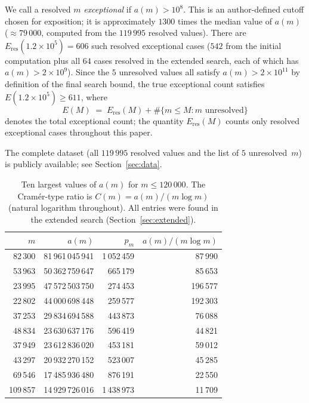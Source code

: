 \documentclass[pdflatex,sn-mathphys-num,Numbered]{sn-jnl}
\theoremstyle{thmstyleone}
\theoremstyle{thmstylethree}
\theoremstyle{thmstyletwo}
\numberwithin{equation}{section}
\begin{document}
We call a resolved $m$ \emph{exceptional} if $a(m) > 10^8$.
This is an author-defined cutoff chosen for exposition;
it is approximately $1300$ times the median value of $a(m)$
($\approx 79\,000$, computed from the $119\,995$ resolved values).
There are $E_{\mathrm{res}}(1.2 \times 10^5) = 606$ such resolved exceptional
cases ($542$ from the initial computation plus all $64$ cases resolved
in the extended search, each of which has $a(m) > 2 \times 10^9$).
Since the $5$ unresolved values all satisfy
$a(m) > 2 \times 10^{11}$ by definition of the final search bound,
the true exceptional count satisfies $E(1.2 \times 10^5) \geq 611$, where
\[
E(M) \;=\; E_{\mathrm{res}}(M)
+ \#\bigl\{m \leq M : m \text{ unresolved}\bigr\}
\]
denotes the total exceptional count; the quantity $E_{\mathrm{res}}(M)$
counts only resolved exceptional cases throughout this paper.

The complete dataset (all $119\,995$ resolved values and the list of
$5$ unresolved~$m$) is publicly available; see
Section~\ref{sec:data}.

\begin{table}[ht]
	\centering
	\caption{Ten largest values of $a(m)$ for $m \leq 120\,000$.
		The Cram\'er-type ratio is $C(m) = a(m)/(m \log m)$
		(natural logarithm throughout).
		All entries were found in the extended search
		(Section~\ref{sec:extended}).}
	\label{tab:top10}
	\begin{tabular}{rrrr}
		\toprule
		$m$ & $a(m)$ & $p_m$ & $a(m)/(m \log m)$ \\
		\midrule
		82\,300 & 81\,961\,045\,941 & 1\,052\,459 & 87\,990 \\
		53\,963 & 50\,362\,759\,647 &   665\,179 & 85\,653 \\
		23\,995 & 47\,572\,503\,750 &   274\,453 & 196\,577 \\
		22\,802 & 44\,000\,698\,448 &   259\,577 & 192\,303 \\
		37\,253 & 29\,834\,694\,588 &   443\,873 & 76\,088 \\
		48\,834 & 23\,630\,637\,176 &   596\,419 & 44\,821 \\
		37\,949 & 23\,612\,836\,020 &   453\,181 & 59\,012 \\
		43\,297 & 20\,932\,270\,152 &   523\,007 & 45\,285 \\
		69\,546 & 17\,485\,936\,480 &   876\,191 & 22\,550 \\
		109\,857 & 14\,929\,726\,016 & 1\,438\,973 & 11\,709 \\
		\bottomrule
	\end{tabular}
\end{table}
\end{document}
